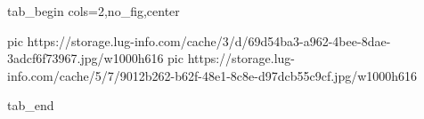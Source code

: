  
 
 
 
 


\ifcmt
  tab_begin cols=2,no_fig,center

     pic https://storage.lug-info.com/cache/3/d/69d54ba3-a962-4bee-8dae-3adcf6f73967.jpg/w1000h616%
		 pic https://storage.lug-info.com/cache/5/7/9012b262-b62f-48e1-8c8e-d97dcb55c9cf.jpg/w1000h616%

  tab_end
\fi
